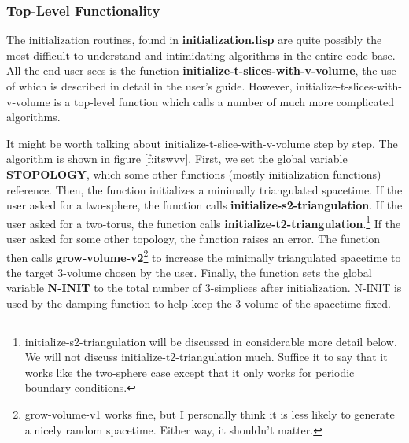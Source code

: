 \message{ !name(programmers_guide.tex)}\documentclass[12pt]{article}
\begin{document}
\subsubsection{Top-Level Functionality}
\label{s:initialization:top-level}
The initialization routines, found in \textbf{initialization.lisp} are
quite possibly the most difficult to understand and intimidating
algorithms in the entire code-base. All the end user sees is the
function \textbf{initialize-t-slices-with-v-volume}, the use of which
is described in detail in the user's guide. However,
initialize-t-slices-with-v-volume is a top-level function which calls
a number of much more complicated algorithms.

It might be worth talking about initialize-t-slice-with-v-volume step
by step. The algorithm is shown in figure \ref{f:itswvv}. First, we
set the global variable \textbf{STOPOLOGY}, which some other functions
(mostly initialization functions) reference. Then, the function
initializes a minimally triangulated spacetime. If the user asked for
a two-sphere, the function calls
\textbf{initialize-s2-triangulation}. If the user asked for a
two-torus, the function calls
\textbf{initialize-t2-triangulation}.\footnote{initialize-s2-triangulation
  will be discussed in considerable more detail below. We will not
  discuss initialize-t2-triangulation much. Suffice it to say that it
  works like the two-sphere case except that it only works for
  periodic boundary conditions.} If the user asked for some other
topology, the function raises an error. The function then calls
\textbf{grow-volume-v2}\footnote{grow-volume-v1 works fine, but I
  personally think it is less likely to generate a nicely random
  spacetime. Either way, it shouldn't matter.} to increase the
minimally triangulated spacetime to the target 3-volume chosen by the
user. Finally, the function sets the global variable \textbf{N-INIT}
to the total number of 3-simplices after initialization. N-INIT is
used by the damping function to help keep the 3-volume of the
spacetime fixed.
\end{document}
